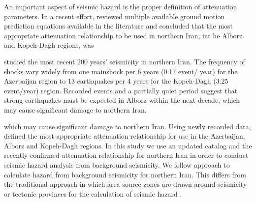 





An important aspect of seismic hazard is the proper definition of attenuation parameters. In a recent effort, \citet{Zafarani2014} reviewed multiple available ground motion prediction equations available in the literature and concluded that the most appropriate attenuation relationship to be used in northern Iran, int he Alborz and Kopeh-Dagh regions, was











\citet{Nemati2015} studied the most recent 200 years' seismicity in northern Iran. The frequency of shocks vary widely from one mainshock per 6 years (0.17 event/ year) for the Azerbaijan region to 13 earthquakes per 4 years for the Kopeh-Dagh (3.25 event/year) region. Recorded events and a partially quiet period suggest that strong earthquakes must be expected in Alborz within the next decade, which may cause significant damage to northern Iran.

which may cause significant damage to northern Iran. Using newly recorded data, \citet{Zafarani2014} defined the most appropriate attenuation relationship for use in the Azerbaijan, Alborz and Kopeh-Dagh regions. In this study we use an updated catalog and the recently confirmed attenuation relationship for northern Iran \citep[i.e.,][]{Kalkan2004} in order to conduct seismic hazard analysis from background seismicity. We follow \citet{Frankel1995} approach to calculate hazard from background seismicity for northern Iran. This differs from the traditional approach in which area source zones are drawn around seismicity or tectonic provinces for the calculation of seismic hazard \citep{Cornell1968}.

